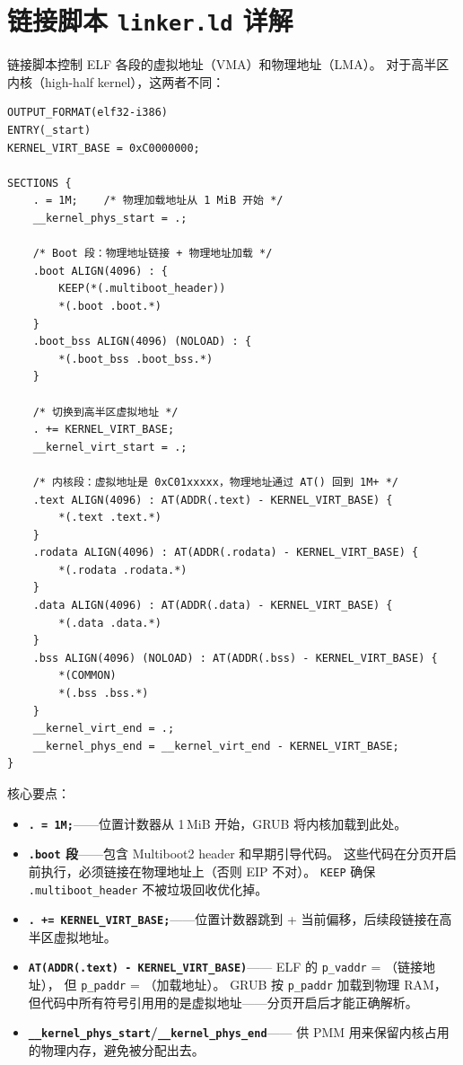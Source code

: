 \section{链接脚本 \texttt{linker.ld} 详解}

链接脚本控制 ELF 各段的虚拟地址（VMA）和物理地址（LMA）。
对于高半区内核（high-half kernel），这两者不同：

\begin{lstlisting}[style=cstyle, language={}]
OUTPUT_FORMAT(elf32-i386)
ENTRY(_start)
KERNEL_VIRT_BASE = 0xC0000000;

SECTIONS {
    . = 1M;    /* 物理加载地址从 1 MiB 开始 */
    __kernel_phys_start = .;

    /* Boot 段：物理地址链接 + 物理地址加载 */
    .boot ALIGN(4096) : {
        KEEP(*(.multiboot_header))
        *(.boot .boot.*)
    }
    .boot_bss ALIGN(4096) (NOLOAD) : {
        *(.boot_bss .boot_bss.*)
    }

    /* 切换到高半区虚拟地址 */
    . += KERNEL_VIRT_BASE;
    __kernel_virt_start = .;

    /* 内核段：虚拟地址是 0xC01xxxxx，物理地址通过 AT() 回到 1M+ */
    .text ALIGN(4096) : AT(ADDR(.text) - KERNEL_VIRT_BASE) {
        *(.text .text.*)
    }
    .rodata ALIGN(4096) : AT(ADDR(.rodata) - KERNEL_VIRT_BASE) {
        *(.rodata .rodata.*)
    }
    .data ALIGN(4096) : AT(ADDR(.data) - KERNEL_VIRT_BASE) {
        *(.data .data.*)
    }
    .bss ALIGN(4096) (NOLOAD) : AT(ADDR(.bss) - KERNEL_VIRT_BASE) {
        *(COMMON)
        *(.bss .bss.*)
    }
    __kernel_virt_end = .;
    __kernel_phys_end = __kernel_virt_end - KERNEL_VIRT_BASE;
}
\end{lstlisting}

核心要点：

\begin{itemize}
  \item \textbf{\texttt{. = 1M;}}——位置计数器从 1\,MiB 开始，GRUB 将内核加载到此处。

  \item \textbf{\texttt{.boot} 段}——包含 Multiboot2 header 和早期引导代码。
        这些代码在分页开启前执行，必须链接在物理地址上（否则 EIP 不对）。
        \texttt{KEEP} 确保 \texttt{.multiboot\_header} 不被垃圾回收优化掉。

  \item \textbf{\texttt{. += KERNEL\_VIRT\_BASE;}}——位置计数器跳到
         + 当前偏移，后续段链接在高半区虚拟地址。

  \item \textbf{\texttt{AT(ADDR(.text) - KERNEL\_VIRT\_BASE)}}——
        ELF 的 \texttt{p\_vaddr} = （链接地址），
        但 \texttt{p\_paddr} = （加载地址）。
        GRUB 按 \texttt{p\_paddr} 加载到物理 RAM，
        但代码中所有符号引用用的是虚拟地址——分页开启后才能正确解析。

  \item \textbf{\texttt{\_\_kernel\_phys\_start}/\texttt{\_\_kernel\_phys\_end}}——
        供 PMM 用来保留内核占用的物理内存，避免被分配出去。
\end{itemize}

